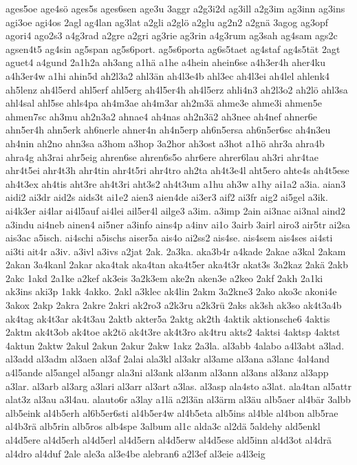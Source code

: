 {ages5oe
age4sö
ages5s
ages6sen
age3u
3aggr
a2g3i2d
ag3ill
a2g3im
ag3inn
ag3ins
agi3oe
agi4os
2agl
ag4lan
ag3lat
a2gli
a2glö
a2glu
ag2n2
a2gnä
3agog
ag3opf
agori4
ago2s3
a4g3rad
a2gre
a2gri
ag3rie
ag3rin
a4g3rum
ag3sah
ag4sam
ags2c
agsen4t5
ag4sin
ag5span
ag5s6port.
ag5s6porta
ag6s5taet
ag4staf
ag4s5tät
2agt
aguet4
a4gund
2a1h2a
ah3ang
a1hä
a1he
a4hein
ahein6se
a4h3er4h
aher4ku
a4h3er4w
a1hi
ahin5d
ah2l3a2
ahl3än
ah4l3e4b
ahl3ec
ah4l3ei
ah4lel
ahlenk4
ah5lenz
ah4l5erd
ahl5erf
ahl5erg
ah4l5er4h
ah4l5erz
ahli4n3
ah2l3o2
ah2lö
ahl3sa
ahl4sal
ahl5se
ahls4pa
ah4m3ae
ah4m3ar
ah2m3ä
ahme3e
ahme3i
ahmen5e
ahmen7sc
ah3mu
ah2n3a2
ahnae4
ah4nas
ah2n3ä2
ah3nee
ah4nef
ahner6e
ahn5er4h
ahn5erk
ah6nerle
ahner4n
ah4n5erp
ah6n5ersa
ah6n5er6sc
ah4n3eu
ah4nin
ah2no
ahn3sa
a3hom
a3hop
3a2hor
ah3ost
a3hot
a1hö
ahr3a
ahra4b
ahra4g
ah3rai
ahr5eig
ahren6se
ahren6s5o
ahr6ere
ahrer6lau
ah3ri
ahr4tae
ahr4t5ei
ahr4t3h
ahr4tin
ahr4t5ri
ahr4tro
ah2ta
ah4t3e4l
aht5ero
ahte4s
ah4t5ese
ah4t3ex
ah4tis
aht3re
ah4t3ri
aht3s2
ah4t3um
a1hu
ah3w
a1hy
ai1a2
a3ia.
aian3
aidi2
ai3dr
aid2s
aids3t
ai1e2
aien3
aien4de
ai3er3
aif2
ai3fr
aig2
ai5gel
a3ik.
ai4k3er
ai4lar
ai4l5auf
ai4lei
ail5er4l
ailge3
a3im.
a3imp
2ain
ai3nac
ai3nal
aind2
a3indu
ai4neb
ainen4
ai5ner
a3info
ains4p
a4inv
ai1o
3airb
3airl
airo3
air5tr
ai2sa
ais3ac
a5isch.
ai4schi
a5ischs
aiser5a
ais4o
ai2ss2
ais4se.
ais4sem
ais4ses
ai4sti
ai3ti
ait4r
a3iv.
a3ivl
a3ivs
a2jat
2ak.
2a3ka.
aka3b4r
a4kade
2akae
a3kal
2akam
2akan
3a4kanl
2akar
aka4tak
aka4tan
aka4t5er
aka4t3r
akat3s
3a2kaz
2akä
2akb
2akc
1akd
2a1ke
a2kef
ak3eis
3a2k3em
ake2n
aken3e
a2keo
2akf
2akh
2a1ki
ak3ins
aki3p
1akk
4akko.
2akl
a3klec
ak4lin
2akm
3a2kne3
2ako
ako3c
akoni4e
3akox
2akp
2akra
2akre
2akri
ak2ro3
a2k3ru
a2k3rü
2aks
ak3sh
ak3so
ak4t3a4b
ak4tag
ak4t3ar
ak4t3au
2aktb
akter5a
2aktg
ak2th
4aktik
aktionsche6
4aktis
2aktm
ak4t3ob
ak4toe
ak2tö
ak4t3re
ak4t3ro
ak4tru
akts2
4aktsi
4aktsp
4aktst
4aktun
2aktw
2akul
2akun
2akur
2akw
1akz
2a3la.
al3abb
4alabo
a4l3abt
a3lad.
al3add
al3adm
al3aen
al3af
2alai
ala3kl
al3akr
al3ame
al3ana
a3lanc
4al4and
a4l5ande
al5angel
al5angr
ala3ni
al3ank
al3anm
al3ann
al3ans
al3anz
al3app
a3lar.
al3arb
al3arg
a3lari
al3arr
al3art
a3las.
al3asp
ala4sto
a3lat.
ala4tan
al5attr
alat3z
al3au
a3l4au.
alauto6r
a3lay
a1lä
a2l3än
al3ärm
al3äu
alb5aer
al4bär
3albb
alb5eink
al4b5erh
al6b5er6sti
al4b5er4w
al4b5eta
alb5ins
al4ble
al4bon
alb5rae
al4b3rä
alb5rin
alb5ros
alb4spe
3album
al1c
alda3c
al2dä
5aldehy
ald5enkl
al4d5ere
al4d5erh
al4d5erl
al4d5ern
al4d5erw
al4d5ese
ald5inn
al4d3ot
al4drä
al4dro
al4duf
2ale
ale3a
al3e4be
alebran6
a2l3ef
al3eie
a4l3eig
}
